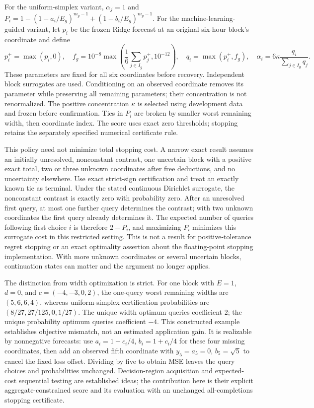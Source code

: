 \documentclass[12pt]{article}
\begin{document}
For the uniform-simplex variant, $\alpha_j=1$ and
$P_i=1-(1-a_i/E_g)^{m_g-1}+(1-b_i/E_g)^{m_g-1}$.
For the machine-learning-guided variant, let $p_i$ be the frozen Ridge
forecast at an original six-hour block's coordinate and define
\[
 p_i^+=\max(p_i,0),\quad
 f_g=10^{-8}\max\!\left(\frac{1}{6}\sum_{j\in I_g}p_j^+,10^{-12}\right),
 \quad q_i=\max(p_i^+,f_g),\quad
 \alpha_i=6\kappa\frac{q_i}{\sum_{j\in I_g}q_j}.
\]
These parameters are fixed for all six coordinates before recovery.
Independent block surrogates are used. Conditioning on an observed
coordinate removes its parameter while preserving all remaining parameters;
their concentration is not renormalized. The positive concentration
$\kappa$ is selected using development data and frozen before confirmation.
Ties in $P_i$ are broken by smaller worst remaining width, then coordinate
index. The score uses exact zero thresholds; stopping retains the separately
specified numerical certificate rule.

This policy need not minimize total stopping cost. A narrow exact result
assumes an initially unresolved, nonconstant contrast, one uncertain block
with a positive exact total, two or three unknown coordinates after free
deductions, and no uncertainty elsewhere. Use exact strict-sign
certification and treat an exactly known tie as terminal. Under the stated
continuous Dirichlet surrogate, the nonconstant contrast is exactly zero
with probability zero. After an unresolved first query, at most one further
query determines the contrast; with two unknown coordinates the first
query already determines it. The expected number of queries following
first choice $i$ is therefore $2-P_i$, and maximizing $P_i$ minimizes this
surrogate cost in this restricted setting. This is not a result for
positive-tolerance regret stopping or an exact optimality assertion about
the floating-point stopping implementation. With more unknown coordinates
or several uncertain blocks, continuation states can matter and the
argument no longer applies.

The distinction from width optimization is strict. For one block with
$E=1$, $d=0$, and $c=(-4,-3,0,2)$, the one-query worst remaining widths are
$(5,6,6,4)$, whereas uniform-simplex certification probabilities are
$(8/27,27/125,0,1/27)$. The unique width optimum queries coefficient $2$;
the unique probability optimum queries coefficient $-4$. This constructed
example establishes objective mismatch, not an estimated application gain.
It is realizable by nonnegative forecasts: use $a_i=1-c_i/4$,
$b_i=1+c_i/4$ for these four missing coordinates, then add an observed
fifth coordinate with $y_5=a_5=0$, $b_5=\sqrt5$ to cancel the fixed
loss offset. Dividing by five to obtain MSE leaves the query choices
and probabilities unchanged.
Decision-region acquisition and expected-cost sequential testing are
established ideas; the contribution here is their explicit
aggregate-constrained score and its evaluation with an unchanged
all-completions stopping certificate.
\end{document}
